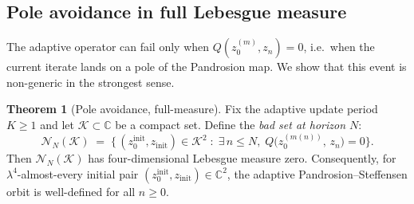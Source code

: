 \documentclass[11pt,a4paper]{article}
\theoremstyle{definition}
\newtheorem{theorem}{Theorem}[section]
\newcommand{\CC}{\mathbb{C}}
\begin{document}
\subsection{Pole avoidance in full Lebesgue measure}

The adaptive operator can fail only when $Q(z_0^{(m)}, z_n) = 0$, i.e.\ when the current iterate lands on a pole of the Pandrosion map.  We show that this event is non-generic in the strongest sense.

\begin{theorem}[Pole avoidance, full-measure]
\label{thm:pole_avoidance}
Fix the adaptive update period $K \geq 1$ and let $\mathcal{K} \subset \CC$ be a compact set.  Define the \emph{bad set at horizon $N$}:
\[
  \mathcal{N}_N(\mathcal{K}) \;=\; \bigl\{\, (z_0^{\mathrm{init}}, z_{\mathrm{init}}) \in \mathcal{K}^2 \;:\;\exists\, n \leq N,\; Q\bigl(z_0^{(m(n))},\, z_n\bigr) = 0 \bigr\}.
\]
Then $\mathcal{N}_N(\mathcal{K})$ has four-dimensional Lebesgue measure zero.  Consequently, for $\lambda^4$-almost-every initial pair $(z_0^{\mathrm{init}}, z_{\mathrm{init}}) \in \CC^2$, the adaptive Pandrosion--Steffensen orbit is well-defined for all $n \geq 0$.
\end{theorem}
\end{document}
